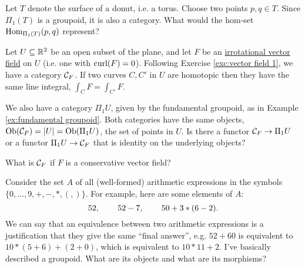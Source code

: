 \documentclass[CT4S-EN-RU]{subfiles}
\begin{document}
\begin{exampleRUS}\label{ex:fundamental groupoid}
\end{exampleRUS}

\begin{exerciseENG}
Let $T$ denote the surface of a donut, i.e. a torus. Choose two points $p,q\in T$. Since $\Pi_1(T)$ is a groupoid, it is also a category. What would the hom-set $\textnormal{Hom}_{\Pi_1(T)}(p,q)$ represent?
\end{exerciseENG}

\begin{exerciseRUS}
\end{exerciseRUS}

\begin{exerciseENG}
Let $U\subseteq{\mathbb R}^2$ be an open subset of the plane, and let $F$ be an \href{http://en.wikipedia.org/wiki/Conservative_vector_field#Irrotational_vector_fields}{\text irrotational vector field} on $U$ (i.e. one with $\textnormal{curl}(F)=0$). Following Exercise \ref{exc:vector field 1}, we have a category $\mathcal{C}_F$. If two curves $C,C'$ in $U$ are homotopic then they have the same line integral, $\int_CF=\int_{C'}F$.

We also have a category $\Pi_1U$, given by the fundamental groupoid, as in Example \ref{ex:fundamental groupoid}. Both categories have the same objects, $\textnormal{Ob}(\mathcal{C}_F)=|U|=\textnormal{Ob}(\Pi_1U)$, the set of points in $U$.
\sexc Is there a functor $\mathcal{C}_F\rightarrow\Pi_1U$ or a functor $\Pi_1U\rightarrow\mathcal{C}_F$ that is identity on the underlying objects? 
\item What is $\mathcal{C}_F$ if $F$ is a conservative vector field?
\endsexc
\end{exerciseENG}

\begin{exerciseRUS}
\end{exerciseRUS}

\begin{exerciseENG}
Consider the set $A$ of all (well-formed) arithmetic expressions in the symbols $\{0,\ldots,9,+,-,*,(,)\}$. For example, here are some elements of $A$: $$52,\hspace{.3in} 52-7,\hspace{.3in} 50+3*(6-2).$$ We can say that an equivalence between two arithmetic expressions is a justification that they give the same “final answer”, e.g. $52+60$ is equivalent to $10*(5+6)+(2+0)$, which is equivalent to $10*11+2$. I've basically described a groupoid. What are its objects and what are its morphisms?
\end{exerciseENG}
\end{document}
